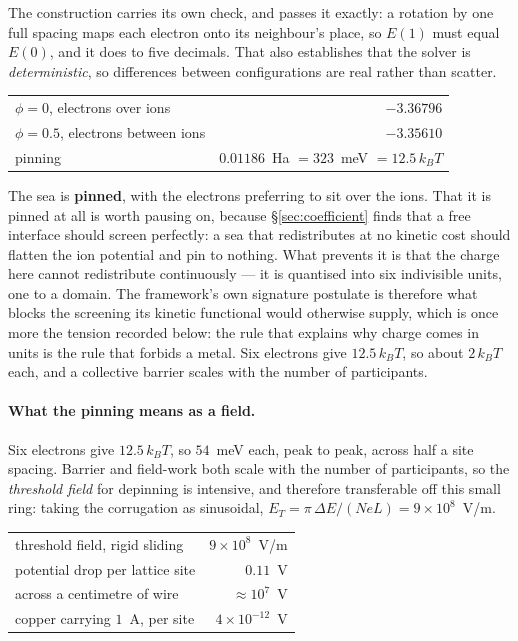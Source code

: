 \documentclass[11pt]{article}
\begin{document}
The construction carries its own check, and passes it exactly: a rotation by one full spacing maps
each electron onto its neighbour's place, so $E(1)$ must equal $E(0)$, and it does to five decimals.
That also establishes that the solver is \emph{deterministic}, so differences between configurations
are real rather than scatter.

\begin{center}
\small
\begin{tabular}{@{}lr@{}}
\toprule
$\phi=0$, electrons over ions & $-3.36796$\\
$\phi=0.5$, electrons between ions & $-3.35610$\\
\midrule
pinning & $0.01186$~Ha $=323$~meV $=12.5\,k_BT$\\
\bottomrule
\end{tabular}
\end{center}

\noindent The sea is \textbf{pinned}, with the electrons preferring to sit over the ions. That it is
pinned at all is worth pausing on, because \S\ref{sec:coefficient} finds that a free interface should screen perfectly: a sea
that redistributes at no kinetic cost should flatten the ion potential and pin to nothing. What
prevents it is that the charge here cannot redistribute continuously --- it is quantised into six
indivisible units, one to a domain. The framework's own signature postulate is therefore what blocks
the screening its kinetic functional would otherwise supply, which is once more the tension recorded
below: the rule that explains why charge comes in units is the rule that forbids a metal. Six
electrons give $12.5\,k_BT$, so about $2\,k_BT$ each, and a collective barrier scales with the number
of participants.

\paragraph{What the pinning means as a field.} Six electrons give $12.5\,k_BT$, so $54$~meV each,
peak to peak, across half a site spacing. Barrier and field-work both scale with the number of
participants, so the \emph{threshold field} for depinning is intensive, and therefore transferable
off this small ring: taking the corrugation as sinusoidal, $E_T=\pi\,\Delta E/(NeL)=9\times10^{8}$~V/m.

\begin{center}
\small
\begin{tabular}{@{}lr@{}}
\toprule
threshold field, rigid sliding & $9\times10^{8}$~V/m\\
potential drop per lattice site & $0.11$~V\\
across a centimetre of wire & ${\approx}10^{7}$~V\\
\midrule
copper carrying $1$~A, per site & $4\times10^{-12}$~V\\
\bottomrule
\end{tabular}
\end{center}
\end{document}
